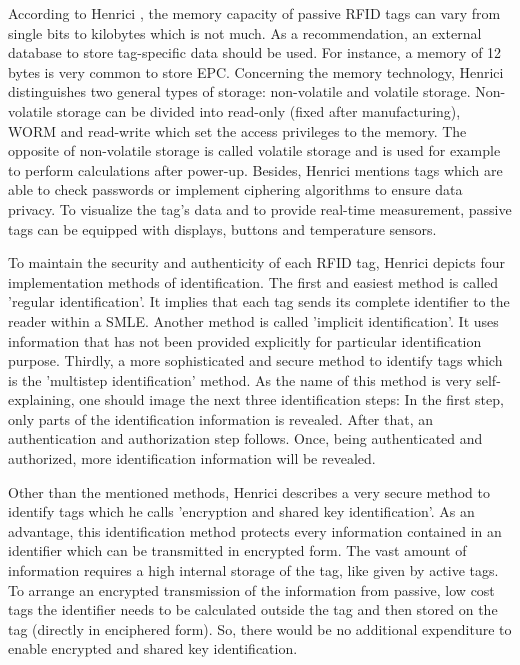 According to Henrici \cite{henrici}, the memory capacity of passive RFID tags can vary from single bits to kilobytes which is not much. As a recommendation, an external database to store tag-specific data should be used. For instance, a memory of 12 bytes is very common to store \ac{EPC}. Concerning the memory technology, Henrici distinguishes two general types of storage: non-volatile and volatile storage. Non-volatile storage can be divided into read-only (fixed after manufacturing), \ac{WORM} and read-write which set the access privileges to the memory. The opposite of non-volatile storage is called volatile storage and is used for example to perform calculations after power-up. Besides, Henrici mentions tags which are able to check passwords or implement ciphering algorithms to ensure data privacy. To visualize the tag's data and to provide real-time measurement, passive tags can be equipped with displays, buttons and temperature sensors. 

To maintain the security and authenticity of each RFID tag, Henrici \cite[p.93 ff.]{henrici} depicts four implementation methods of identification. 
The first and easiest method is called 'regular identification'. It implies that each tag sends its complete identifier to the reader within a \ac{SMLE}. Another method is called 'implicit identification'. It uses information that has not been provided explicitly for particular identification purpose. Thirdly, a more sophisticated and secure method to identify tags which is the 'multistep identification' method. As the name of this method is very self-explaining, one should image the next three identification steps: In the first step, only parts of the identification information is revealed. After that, an authentication and authorization step follows. Once, being authenticated and authorized, more identification information will be revealed. 

Other than the mentioned methods, Henrici describes a very secure method to identify tags which he calls 'encryption and shared key identification'. As an advantage, this identification method protects every information contained in an identifier which can be transmitted in encrypted form. The vast amount of information requires a high internal storage of the tag, like given by active tags. To arrange an encrypted transmission of the information from passive, low cost tags the identifier needs to be calculated outside the tag and then stored on the tag (directly in enciphered form). So, there would be no additional expenditure to enable encrypted and shared key identification. 

